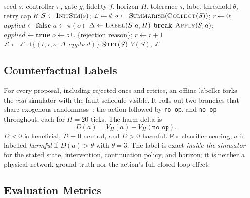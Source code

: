 \documentclass[conference]{IEEEtran}
\begin{document}
\begin{algorithm}[t]
\caption{Gated episode with paired counterfactual labelling}
\label{alg:episode}
\begin{algorithmic}[1]
\Require seed $s$, controller $\pi$, gate $g$, fidelity $f$, horizon $H$, tolerance $\tau$, label threshold $\theta$, retry cap $R$
\State $S \gets \textsc{InitSim}(s)$; \; $\mathcal{L} \gets \emptyset$
    \State $o \gets \textsc{Summarise}(\textsc{Collect}(S))$; \; $r \gets 0$; \; $\mathit{applied} \gets \textbf{false}$
      \State $a \gets \pi(o)$
      \State $\Delta \gets \textsc{Label}(S, a, H)$ 
       \textbf{break} \EndIf
       \State $\textsc{Apply}(S, a)$; \; $\mathit{applied} \gets \textbf{true}$
      \Else \State $o \gets o \cup \{\text{rejection reason}\}$; \; $r \gets r + 1$ \EndIf
      \State $\mathcal{L} \gets \mathcal{L} \cup \{(t, r, a, \Delta, \mathit{applied})\}$
    \EndWhile
  \EndIf
  \State $\textsc{Step}(S)$
\EndFor
\State \Return $V(S)$, $\mathcal{L}$ 
\end{algorithmic}
\end{algorithm}

\subsection{Counterfactual Labels}

For every proposal, including rejected ones and retries, an offline labeller forks the \emph{real} simulator with the fault schedule visible. It rolls out two branches that share exogenous randomness~\cite{crn}: the action followed by \texttt{no\_op}, and \texttt{no\_op} throughout, each for $H = 20$ ticks. The harm delta is
\begin{equation}
D(a) = V_H(a) - V_H(\texttt{no\_op}).
\label{eq:delta}
\end{equation}
$D < 0$ is beneficial, $D = 0$ neutral, and $D > 0$ harmful. For classifier scoring, $a$ is labelled \emph{harmful} if $D(a) > \theta$ with $\theta = 3$. The label is exact \emph{inside the simulator} for the stated state, intervention, continuation policy, and horizon; it is neither a physical-network ground truth nor the action's full closed-loop effect.

\subsection{Evaluation Metrics}
\end{document}
